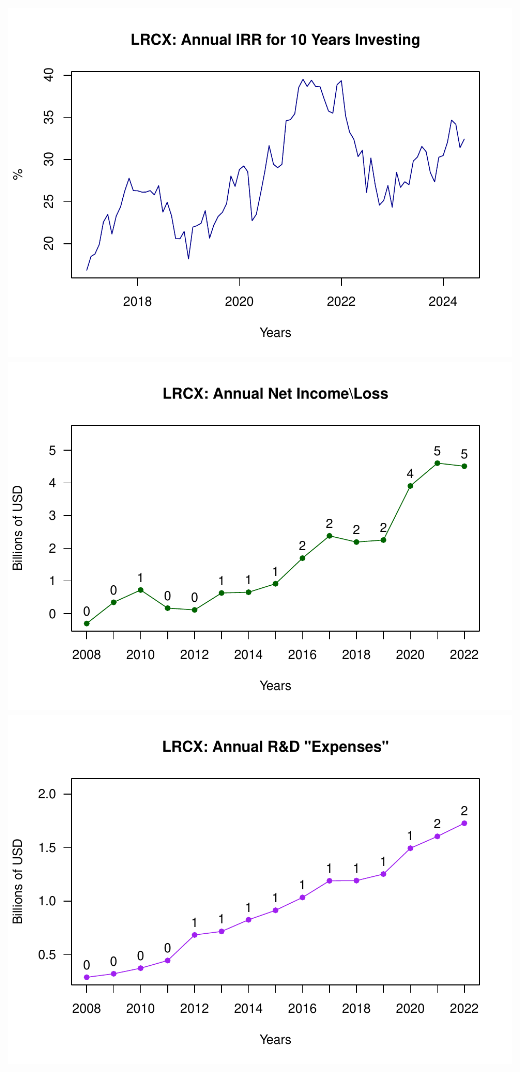 \documentclass[
]{book}
\begin{document}
\includegraphics{_main_files/figure-latex/unnamed-chunk-1-16.pdf}
\includegraphics{_main_files/figure-latex/unnamed-chunk-1-17.pdf}
\includegraphics{_main_files/figure-latex/unnamed-chunk-1-18.pdf}
\end{document}
